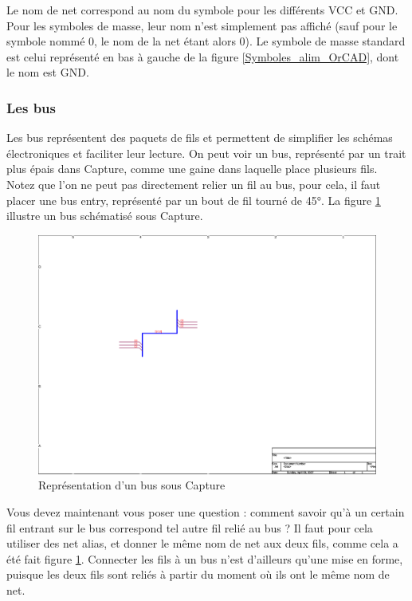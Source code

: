 \documentclass[a4paper]{article}
\begin{document}
Le nom de net correspond au nom du symbole pour les différents VCC et GND. Pour les symboles de masse, leur nom n'est simplement pas affiché (sauf pour le symbole nommé \og{}0\fg{}, le nom de la net étant alors \og{}0\fg{}). Le symbole de masse standard est celui représenté en bas à gauche de la figure \ref{Symboles_alim_OrCAD}, dont le nom est \og{}GND\fg{}.

\subsubsection{Les bus}

Les bus représentent des paquets de fils et permettent de simplifier les schémas électroniques et faciliter leur lecture. On peut voir un bus, représenté par un trait plus épais dans Capture, comme une gaine dans laquelle place plusieurs fils. Notez que l'on ne peut pas directement relier un fil au bus, pour cela, il faut placer une \og{}bus entry\fg{}, représenté par un bout de fil tourné de 45°. La figure \ref{Bus_OrCAD} illustre un bus schématisé sous Capture.

\begin{figure}[H]
	\centering
	\includegraphics[scale=1.00]{Images/Bus_OrCAD}
	\caption{Représentation d'un bus sous Capture
		\label{Bus_OrCAD}}
\end{figure}

Vous devez maintenant vous poser une question : comment savoir qu'à un certain fil entrant sur le bus correspond tel autre fil relié au bus ? Il faut pour cela utiliser des \og{}net alias\fg{}, et donner le même nom de net aux deux fils, comme cela a été fait figure \ref{Bus_OrCAD}. Connecter les fils à un bus n'est d'ailleurs qu'une mise en forme, puisque les deux fils sont reliés à partir du moment où ils ont le même nom de net.
\end{document}
